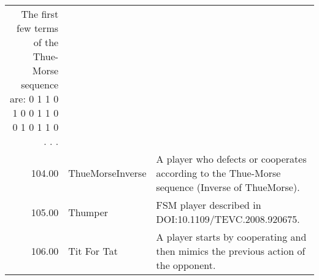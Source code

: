 \begin{tabular}{rll}
	The first few terms of the Thue-Morse sequence are:
	0 1 1 0 1 0 0 1 1 0 0 1 0 1 1 0 . . .                                                                                                                                                                                                                                                                                                                                                                                                                                                                                                                                                                                                                                                                                                                                                                                                                                              \\
	104.00 & ThueMorseInverse            & A player who defects or cooperates according to the Thue-Morse sequence
	(Inverse of ThueMorse).                                                                                                                                                                                                                                                                                                                                                                                                                                                                                                                                                                                                                                                                                                                                                                                                                                                                                                                      \\
	105.00 & Thumper                     & FSM player described in DOI:10.1109/TEVC.2008.920675.                                                                             \\
	106.00 & Tit For Tat                 & A player starts by cooperating and then mimics the previous action of the
	opponent.


\end{tabular}
